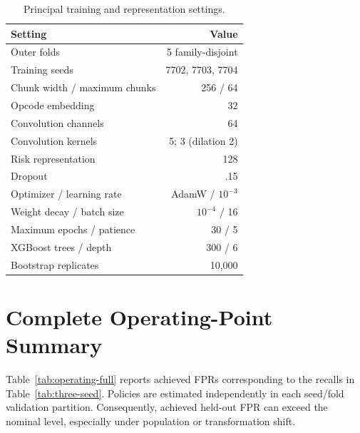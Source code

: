 \documentclass[conference]{IEEEtran}
\begin{document}
\begin{table}[h]
  \centering
  \caption{Principal training and representation settings.}
  \label{tab:hyperparameters}
  \scriptsize
  \setlength{\tabcolsep}{3.0pt}
  \begin{tabular}{@{}lr@{}}
    \toprule
    Setting & Value \\
    \midrule
    Outer folds & 5 family-disjoint \\
    Training seeds & 7702, 7703, 7704 \\
    Chunk width / maximum chunks & 256 / 64 \\
    Opcode embedding & 32 \\
    Convolution channels & 64 \\
    Convolution kernels & 5; 3 (dilation 2) \\
    Risk representation & 128 \\
    Dropout & .15 \\
    Optimizer / learning rate & AdamW / $10^{-3}$ \\
    Weight decay / batch size & $10^{-4}$ / 16 \\
    Maximum epochs / patience & 30 / 5 \\
    XGBoost trees / depth & 300 / 6 \\
    Bootstrap replicates & 10,000 \\
    \bottomrule
  \end{tabular}
\end{table}

\section{Complete Operating-Point Summary}
\label{app:operating}

Table~\ref{tab:operating-full} reports achieved FPRs corresponding to the recalls in
Table~\ref{tab:three-seed}. Policies are estimated independently in each seed/fold validation
partition. Consequently, achieved held-out FPR can exceed the nominal level, especially under
population or transformation shift.
\end{document}
